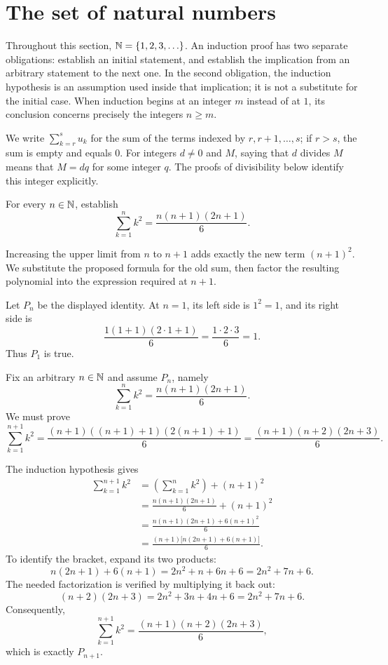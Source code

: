 \section{The set of natural numbers}

Throughout this section, $\mathbb{N}=\{1,2,3,\ldots\}$. An induction proof has
two separate obligations: establish an initial statement, and establish the
implication from an arbitrary statement to the next one. In the second
obligation, the induction hypothesis is an assumption used inside that
implication; it is not a substitute for the initial case. When induction
begins at an integer $m$ instead of at $1$, its conclusion concerns precisely
the integers $n\geq m$.

We write $\sum_{k=r}^{s}u_k$ for the sum of the terms indexed by
$r,r+1,\ldots,s$; if $r>s$, the sum is empty and equals $0$.
For integers $d\ne0$ and $M$, saying that $d$ divides $M$ means that
$M=dq$ for some integer $q$. The proofs of divisibility below identify this
integer explicitly.


\goal For every $n\in\mathbb{N}$, establish
\[
 \sum_{k=1}^{n} k^2=\frac{n(n+1)(2n+1)}{6}.
\]

\idea Increasing the upper limit from $n$ to $n+1$ adds exactly the
new term $(n+1)^2$. We substitute the proposed formula for the old sum,
then factor the resulting polynomial into the expression required at $n+1$.

Let $P_n$ be the displayed identity. At $n=1$, its left side is $1^2=1$,
and its right side is
\[
 \frac{1(1+1)(2\cdot1+1)}{6}
 =\frac{1\cdot2\cdot3}{6}=1.
\]
Thus $P_1$ is true.

Fix an arbitrary $n\in\mathbb{N}$ and assume $P_n$, namely
\[
 \sum_{k=1}^{n}k^2=\frac{n(n+1)(2n+1)}{6}.
\]
We must prove
\[
 \sum_{k=1}^{n+1}k^2
 =\frac{(n+1)((n+1)+1)(2(n+1)+1)}{6}
 =\frac{(n+1)(n+2)(2n+3)}{6}.
\]

The induction hypothesis gives
\begin{align*}
 \sum_{k=1}^{n+1} k^2
 &=\left(\sum_{k=1}^{n}k^2\right)+(n+1)^2\\
 &=\frac{n(n+1)(2n+1)}{6}+(n+1)^2\\
 &=\frac{n(n+1)(2n+1)+6(n+1)^2}{6}\\
 &=\frac{(n+1)\bigl[n(2n+1)+6(n+1)\bigr]}{6}.
\end{align*}
To identify the bracket, expand its two products:
\[
 n(2n+1)+6(n+1)
 =2n^2+n+6n+6
 =2n^2+7n+6.
\]
The needed factorization is verified by multiplying it back out:
\[
 (n+2)(2n+3)
 =2n^2+3n+4n+6
 =2n^2+7n+6.
\]
Consequently,
\[
 \sum_{k=1}^{n+1} k^2
 =\frac{(n+1)(n+2)(2n+3)}{6},
\]
which is exactly $P_{n+1}$.

